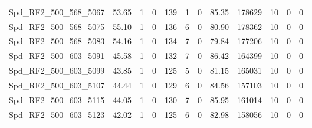 \begin{longtable}[c]{@{}lrrrrrrrrrrr@{}}
Spd\_RF2\_500\_568\_5067      & 53.65                  & 1                       & 0                       & 139                    & 1                       & 0                       & 85.35                   & 178629                   & 10                       & 0                        & 0                        \\
Spd\_RF2\_500\_568\_5075      & 55.10                  & 1                       & 0                       & 136                    & 6                       & 0                       & 80.90                   & 178362                   & 10                       & 0                        & 0                        \\
Spd\_RF2\_500\_568\_5083      & 54.16                  & 1                       & 0                       & 134                    & 7                       & 0                       & 79.84                   & 177206                   & 10                       & 0                        & 0                        \\
Spd\_RF2\_500\_603\_5091      & 45.58                  & 1                       & 0                       & 132                    & 7                       & 0                       & 86.42                   & 164399                   & 10                       & 0                        & 0                        \\
Spd\_RF2\_500\_603\_5099      & 43.85                  & 1                       & 0                       & 125                    & 5                       & 0                       & 81.15                   & 165031                   & 10                       & 0                        & 0                        \\
Spd\_RF2\_500\_603\_5107      & 44.44                  & 1                       & 0                       & 129                    & 6                       & 0                       & 84.56                   & 157103                   & 10                       & 0                        & 0                        \\
Spd\_RF2\_500\_603\_5115      & 44.05                  & 1                       & 0                       & 130                    & 7                       & 0                       & 85.95                   & 161014                   & 10                       & 0                        & 0                        \\
Spd\_RF2\_500\_603\_5123      & 42.02                  & 1                       & 0                       & 125                    & 6                       & 0                       & 82.98                   & 158056                   & 10                       & 0                        & 0                        \\

\end{longtable}
